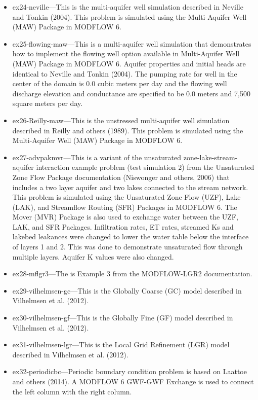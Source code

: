 \begin{itemize}
\item ex24-neville---This is the multi-aquifer well simulation described in Neville and Tonkin (2004).  This problem is simulated using the Multi-Aquifer Well (MAW) Package in MODFLOW 6.
\item ex25-flowing-maw---This is a multi-aquifer well simulation that demonstrates how to implement the flowing well option available in Multi-Aquifer Well (MAW) Package in MODFLOW 6. Aquifer properties and initial heads are identical to Neville and Tonkin (2004).  The pumping rate for well in the center of the domain is 0.0 cubic meters per day and the flowing well discharge elevation and conductance are specified to be 0.0 meters and 7,500 square meters per day.
\item ex26-Reilly-maw---This is the unstressed multi-aquifer well simulation described in Reilly and others (1989).  This problem is simulated using the Multi-Aquifer Well (MAW) Package in MODFLOW 6.
\item ex27-advpakmvr---This is a variant of the unsaturated zone-lake-stream-aquifer interaction example problem (test simulation 2) from the Unsaturated Zone Flow Package documentation (Niswonger and others, 2006) that includes a two layer aquifer and two lakes connected to the stream network.  This problem is simulated using the Unsaturated Zone Flow (UZF), Lake (LAK), and Streamflow Routing (SFR) Packages in MODFLOW 6. The Mover (MVR) Package is also used to exchange water between the UZF, LAK, and SFR Packages. Infiltration rates, ET rates, streamed Ks and lakebed leakances were changed to lower the water table below the interface of layers 1 and 2. This was done to demonstrate unsaturated flow through multiple layers. Aquifer K values were also changed.
\item ex28-mflgr3---The is Example 3 from the MODFLOW-LGR2 documentation.
\item ex29-vilhelmsen-gc---This is the Globally Coarse (GC) model described in Vilhelmsen et al. (2012).
\item ex30-vilhelmsen-gf---This is the Globally Fine (GF) model described in Vilhelmsen et al. (2012).
\item ex31-vilhelmsen-lgr---This is the Local Grid Refinement (LGR) model described in Vilhelmsen et al. (2012).
\item ex32-periodicbc---Periodic boundary condition problem is based on Laattoe and others (2014). A MODFLOW 6 GWF-GWF Exchange is used to connect the left column with the right column. 
\end{itemize}
